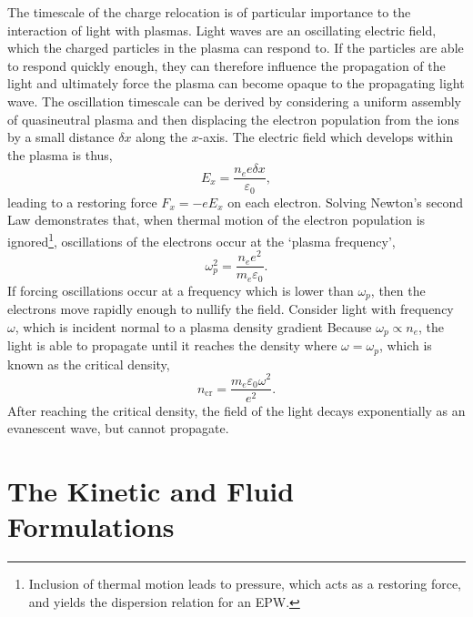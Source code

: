 The timescale of the charge relocation is of particular importance to the interaction of light with plasmas.
Light waves are an oscillating electric field, which the charged particles in the plasma can respond to.
If the particles are able to respond quickly enough, they can therefore influence the propagation of the light and ultimately force the plasma can become opaque to the propagating light wave.
The oscillation timescale can be derived by considering a uniform assembly of quasineutral plasma and then displacing the electron population from the ions by a small distance $\delta x$ along the $x$-axis.
The electric field which develops within the plasma is thus,
\begin{equation}
    E_x = \frac{n_e e \delta x}{\varepsilon_0},
\end{equation}
leading to a restoring force $F_x = -eE_x$ on each electron.
Solving Newton's second Law demonstrates that, when thermal motion of the electron population is ignored\footnote{Inclusion of thermal motion leads to pressure, which acts as a restoring force, and yields the dispersion relation for an \ac{EPW}.}, oscillations of the electrons occur at the `plasma frequency',
\begin{equation}
    \label{eq:theory_plasma_freq}
    \omega_{p}^2 = \frac{n_e e^2}{m_e \varepsilon_0}.
\end{equation}
If forcing oscillations occur at a frequency which is lower than $\omega_p$, then the electrons move rapidly enough to nullify the field.
Consider light with frequency $\omega$, which is incident normal to a plasma density gradient
Because $\omega_p\propto n_e$, the light is able to propagate until it reaches the density where $\omega = \omega_p$, which is known as the critical density,
\begin{equation}
    \label{eq:theory_critical_density}
    n_{\text{cr}} = \frac{m_e \varepsilon_0 \omega^2}{e^2}.
\end{equation}
After reaching the critical density, the field of the light decays exponentially as an evanescent wave, but cannot propagate.

\section{The Kinetic and Fluid Formulations}%
\label{sec:theory_kin_fluid_plasmas}


